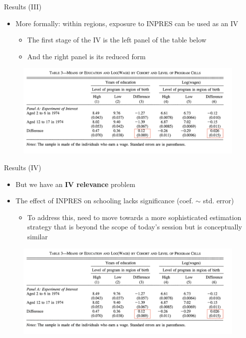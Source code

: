 \documentclass[11pt,notes=hide,aspectratio=169,mathserif]{beamer}
\begin{document}
\begin{frame}{Results (III)}
\begin{itemize}
\item More formally: within regions, exposure to INPRES can be used as an IV
\begin{itemize}
    \item The first stage of the IV is the left panel of the table below
    \item And the right panel is its reduced form
\end{itemize}
\end{itemize}
\begin{figure}
    \centering
    \includegraphics[width=\textwidth]{inputs/Table3a.png}
\end{figure}
\end{frame}

\begin{frame}{Results (IV)}
\begin{itemize}
\item But we have an \textbf{IV relevance} problem
\item The effect of INPRES on schooling lacks significance (coef. $\sim$ std. error) 
\begin{itemize}
    \item To address this, need to move towards a more sophisticated estimation strategy that is beyond the scope of today's session but is conceptually similar
\end{itemize}
\end{itemize}
\begin{figure}
    \centering
    \includegraphics[width=\textwidth]{inputs/Table3a.png}
\end{figure}
\end{frame}
\end{document}
